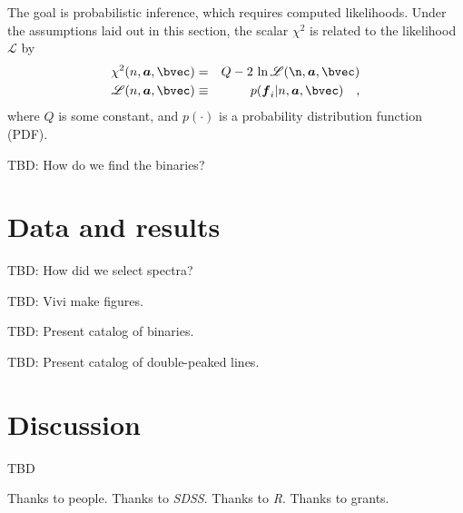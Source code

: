 \documentclass[preprint]{aastex}
\newcommand{\project}[1]{\textsl{#1}}
\newcommand{\SDSS}{\project{SDSS}}
\newcommand{\mmatrix}[1]{\boldsymbol{#1}}
\newcommand{\avec}{\mmatrix{a}}
\newcommand{\fvec}{\mmatrix{f}}
\newcommand{\like}{\mathscr{L}}
\begin{document}
The goal is probabilistic inference, which requires computed
likelihoods.  Under the assumptions laid out in this section, the
scalar $\chi^2$ is related to the likelihood $\like$ by
\begin{eqnarray}\displaystyle
\chi^2(n,\avec,\bvec) &=& Q - 2\,\ln\like(\n,\avec,\bvec) \nonumber\\
\like(n,\avec,\bvec) &\equiv& p(\fvec_i|n,\avec,\bvec)
\quad ,
\end{eqnarray}
where $Q$ is some constant, and $p(\cdot)$ is a probability
distribution function (PDF).

TBD:  How do we find the binaries?

\section{Data and results}

TBD:  How did we select spectra?

TBD:  Vivi make figures.

TBD:  Present catalog of binaries.

TBD:  Present catalog of double-peaked lines.

\section{Discussion}

TBD

\acknowledgements Thanks to people.  Thanks to \SDSS.  Thanks to
\project{R}.  Thanks to grants.
\end{document}
